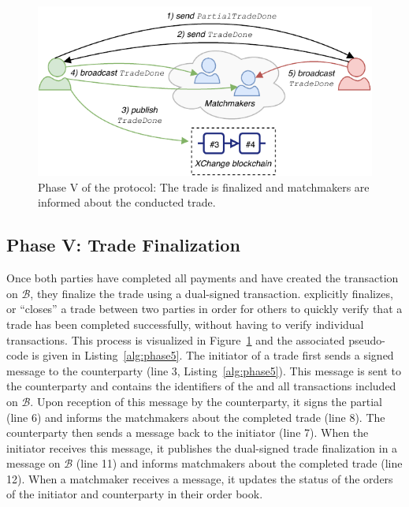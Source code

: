 \begin{figure}[h]
	\centering
	\includegraphics[width=0.7\linewidth]{xchange/assets/xchange_protocol_5}
	\caption{Phase V of the \ModelName{} protocol: The trade is finalized and matchmakers are informed about the conducted trade.}
	\label{fig:matching_protocol_5}
\end{figure}

\subsection{Phase V: Trade Finalization}
\label{sec:phase_finalization}
Once both parties have completed all payments and have created the \TRPayment{} transaction on $ \mathcal{B} $, they finalize the trade using a dual-signed transaction.
\ModelName{} explicitly finalizes, or \enquote{closes} a trade between two parties in order for others to quickly verify that a trade has been completed successfully, without having to verify individual \TRPayment{} transactions.
This process is visualized in Figure~\ref{fig:matching_protocol_5} and the associated pseudo-code is given in Listing~\ref{alg:phase5}. %
The initiator of a trade first sends a signed \MsgPartialTradeDone{} message to the counterparty (line 3, Listing~\ref{alg:phase5}).
This message is sent to the counterparty and contains the identifiers of the \TRAgreement{} and all \TRPayment{} transactions included on $ \mathcal{B} $.
Upon reception of this message by the counterparty, it signs the partial \MsgPartialTradeDone{} (line 6) and informs the matchmakers about the completed trade (line 8).
The counterparty then sends a \MsgTradeDone{} message back to the initiator (line 7).
When the initiator receives this message, it publishes the dual-signed trade finalization in a \TRTradeDone{} message on $ \mathcal{B} $ (line 11) and informs matchmakers about the completed trade (line 12).
When a matchmaker receives a \MsgTradeDone{} message, it updates the status of the orders of the initiator and counterparty in their order book.

